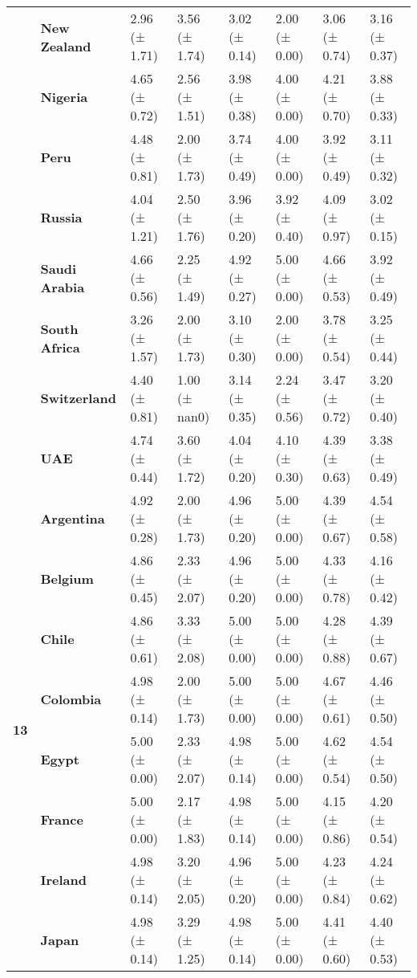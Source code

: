 \begin{longtable}{llllllll}
\textbf{} & \textbf{New Zealand} & 2.96 (± 1.71) & 3.56 (± 1.74) & 3.02 (± 0.14) & 2.00 (± 0.00) & 3.06 (± 0.74) & 3.16 (± 0.37) \\
\textbf{} & \textbf{Nigeria} & 4.65 (± 0.72) & 2.56 (± 1.51) & 3.98 (± 0.38) & 4.00 (± 0.00) & 4.21 (± 0.70) & 3.88 (± 0.33) \\
\textbf{} & \textbf{Peru} & 4.48 (± 0.81) & 2.00 (± 1.73) & 3.74 (± 0.49) & 4.00 (± 0.00) & 3.92 (± 0.49) & 3.11 (± 0.32) \\
\textbf{} & \textbf{Russia} & 4.04 (± 1.21) & 2.50 (± 1.76) & 3.96 (± 0.20) & 3.92 (± 0.40) & 4.09 (± 0.97) & 3.02 (± 0.15) \\
\textbf{} & \textbf{Saudi Arabia} & 4.66 (± 0.56) & 2.25 (± 1.49) & 4.92 (± 0.27) & 5.00 (± 0.00) & 4.66 (± 0.53) & 3.92 (± 0.49) \\
\textbf{} & \textbf{South Africa} & 3.26 (± 1.57) & 2.00 (± 1.73) & 3.10 (± 0.30) & 2.00 (± 0.00) & 3.78 (± 0.54) & 3.25 (± 0.44) \\
\textbf{} & \textbf{Switzerland} & 4.40 (± 0.81) & 1.00 (± nan0) & 3.14 (± 0.35) & 2.24 (± 0.56) & 3.47 (± 0.72) & 3.20 (± 0.40) \\
\textbf{} & \textbf{UAE} & 4.74 (± 0.44) & 3.60 (± 1.72) & 4.04 (± 0.20) & 4.10 (± 0.30) & 4.39 (± 0.63) & 3.38 (± 0.49) \\
\cline{1-8}
\multirow[t]{19}{*}{\textbf{13}} & \textbf{Argentina} & 4.92 (± 0.28) & 2.00 (± 1.73) & 4.96 (± 0.20) & 5.00 (± 0.00) & 4.39 (± 0.67) & 4.54 (± 0.58) \\
\textbf{} & \textbf{Belgium} & 4.86 (± 0.45) & 2.33 (± 2.07) & 4.96 (± 0.20) & 5.00 (± 0.00) & 4.33 (± 0.78) & 4.16 (± 0.42) \\
\textbf{} & \textbf{Chile} & 4.86 (± 0.61) & 3.33 (± 2.08) & 5.00 (± 0.00) & 5.00 (± 0.00) & 4.28 (± 0.88) & 4.39 (± 0.67) \\
\textbf{} & \textbf{Colombia} & 4.98 (± 0.14) & 2.00 (± 1.73) & 5.00 (± 0.00) & 5.00 (± 0.00) & 4.67 (± 0.61) & 4.46 (± 0.50) \\
\textbf{} & \textbf{Egypt} & 5.00 (± 0.00) & 2.33 (± 2.07) & 4.98 (± 0.14) & 5.00 (± 0.00) & 4.62 (± 0.54) & 4.54 (± 0.50) \\
\textbf{} & \textbf{France} & 5.00 (± 0.00) & 2.17 (± 1.83) & 4.98 (± 0.14) & 5.00 (± 0.00) & 4.15 (± 0.86) & 4.20 (± 0.54) \\
\textbf{} & \textbf{Ireland} & 4.98 (± 0.14) & 3.20 (± 2.05) & 4.96 (± 0.20) & 5.00 (± 0.00) & 4.23 (± 0.84) & 4.24 (± 0.62) \\
\textbf{} & \textbf{Japan} & 4.98 (± 0.14) & 3.29 (± 1.25) & 4.98 (± 0.14) & 5.00 (± 0.00) & 4.41 (± 0.60) & 4.40 (± 0.53) \\

\end{longtable}
